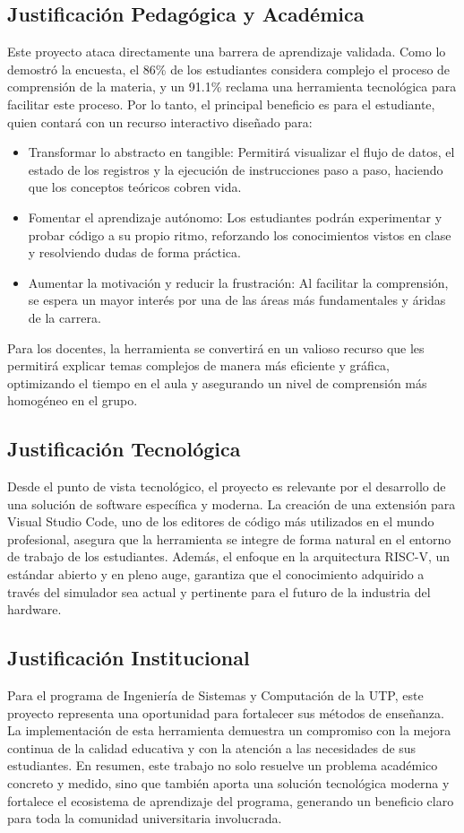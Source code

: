 \documentclass[12pt, letterpaper]{article}
\begin{document}
\subsection{Justificación Pedagógica y Académica}
Este proyecto ataca directamente una barrera de aprendizaje validada. Como lo demostró la encuesta, el 86\% de los estudiantes considera complejo el proceso de comprensión de la materia, y un 91.1\% reclama una herramienta tecnológica para facilitar este proceso. Por lo tanto, el principal beneficio es para el estudiante, quien contará con un recurso interactivo diseñado para:
\begin{itemize}
    \item Transformar lo abstracto en tangible: Permitirá visualizar el flujo de datos, el estado de los registros y la ejecución de instrucciones paso a paso, haciendo que los conceptos teóricos cobren vida.
    \item Fomentar el aprendizaje autónomo: Los estudiantes podrán experimentar y probar código a su propio ritmo, reforzando los conocimientos vistos en clase y resolviendo dudas de forma práctica.
    \item Aumentar la motivación y reducir la frustración: Al facilitar la comprensión, se espera un mayor interés por una de las áreas más fundamentales y áridas de la carrera.
\end{itemize}
Para los docentes, la herramienta se convertirá en un valioso recurso que les permitirá explicar temas complejos de manera más eficiente y gráfica, optimizando el tiempo en el aula y asegurando un nivel de comprensión más homogéneo en el grupo.

\subsection{Justificación Tecnológica}
Desde el punto de vista tecnológico, el proyecto es relevante por el desarrollo de una solución de software específica y moderna. La creación de una extensión para Visual Studio Code, uno de los editores de código más utilizados en el mundo profesional, asegura que la herramienta se integre de forma natural en el entorno de trabajo de los estudiantes. Además, el enfoque en la arquitectura RISC-V, un estándar abierto y en pleno auge, garantiza que el conocimiento adquirido a través del simulador sea actual y pertinente para el futuro de la industria del hardware.

\subsection{Justificación Institucional}
Para el programa de Ingeniería de Sistemas y Computación de la UTP, este proyecto representa una oportunidad para fortalecer sus métodos de enseñanza. La implementación de esta herramienta demuestra un compromiso con la mejora continua de la calidad educativa y con la atención a las necesidades de sus estudiantes. En resumen, este trabajo no solo resuelve un problema académico concreto y medido, sino que también aporta una solución tecnológica moderna y fortalece el ecosistema de aprendizaje del programa, generando un beneficio claro para toda la comunidad universitaria involucrada.
\end{document}
